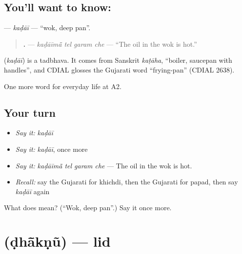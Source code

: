 \subsection*{You'll want to know: }
\textbf{} — \emph{kaḍāī} — \textquotedblleft{}wok, deep pan\textquotedblright{}.

\begin{quote}
\textbf{   .} — \emph{kaḍāīmā̃ tel garam che} — \textquotedblleft{}The oil in the wok is hot.\textquotedblright{}
\end{quote}

\begin{cousinweb}
\textbf{} (\emph{kaḍāī}) is a tadbhava. It comes from Sanskrit \emph{kaṭāha}, \textquotedblleft{}boiler, saucepan with handles\textquotedblright{}, and CDIAL glosses the Gujarati word \textquotedblleft{}frying-pan\textquotedblright{} (CDIAL 2638).
\end{cousinweb}

\begin{grammarlens}[title={What you've built}]
One more word for everyday life at A2.
\end{grammarlens}

\subsection*{Your turn}
\begin{itemize}
\raggedright
  \item \emph{Say it:} \emph{kaḍāī}
  \item \emph{Say it:} \emph{kaḍāī}, once more
  \item \emph{Say it:} \emph{kaḍāīmā̃ tel garam che} — The oil in the wok is hot.
  \item \emph{Recall:} say the Gujarati for khichdi, then the Gujarati for papad, then say \emph{kaḍāī} again
\end{itemize}

\begin{tcolorbox}[breakable,colback=teal!4,colframe=teal!35!black,title={Before you move on}]
What does  mean? (\textquotedblleft{}Wok, deep pan\textquotedblright{}.) Say it once more.
\end{tcolorbox}
\section[\texorpdfstring{\gu{ઢાંકણું} (ḍhā̃kṇũ)}{ઢાંકણું (ḍhā̃kṇũ)}]{ (ḍhā̃kṇũ) — lid}


